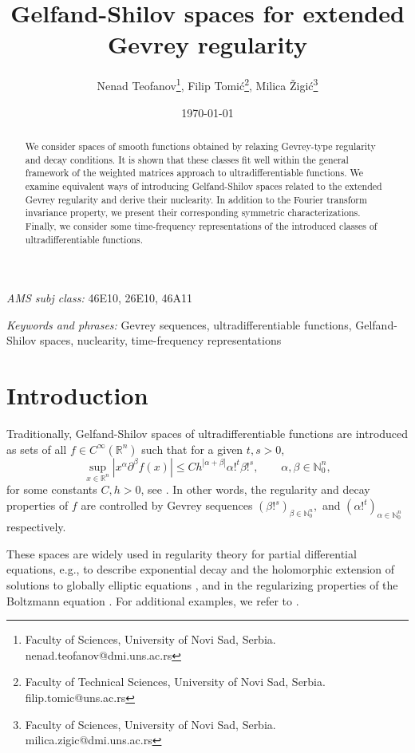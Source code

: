 \documentclass{article}
\title{Gelfand-Shilov spaces for extended Gevrey regularity}
\author{Nenad Teofanov\footnote{Faculty of Sciences, University of Novi Sad, Serbia. nenad.teofanov@dmi.uns.ac.rs}, Filip Tomi\'c\footnote{Faculty of Technical Sciences, University of Novi Sad, Serbia. filip.tomic@uns.ac.rs}, Milica \v Zigi\'c\footnote{Faculty of Sciences, University of Novi Sad, Serbia. milica.zigic@dmi.uns.ac.rs}}
\date{\today}
\theoremstyle{thmstyleone}
\theoremstyle{thmstyletwo}%
\theoremstyle{thmstylethree}%
\begin{document}
\maketitle

\begin{abstract}
 We consider spaces of smooth functions obtained by relaxing Gevrey-type regularity and decay conditions. It is shown that these classes fit well within the general framework of the weighted matrices approach to ultradifferentiable functions. We examine equivalent ways of introducing Gelfand-Shilov spaces related to the extended Gevrey regularity and derive their nuclearity. In addition to the Fourier transform invariance property, we present their corresponding symmetric characterizations. Finally, we consider some time-frequency representations of the introduced classes of ultradifferentiable functions.  
\end{abstract}

{\em AMS subj class:} 46E10,  26E10, 46A11 

{\em Keywords and phrases:} Gevrey sequences, ultradifferentiable functions, Gel\-fand-Shilov spaces, nuclearity, time-frequency representations

\section{Introduction} \label{Sec1}


Traditionally, Gelfand-Shilov spaces 
of ultradifferentiable functions 
are introduced as sets of all $f\in C^\infty (\mathbb R^n)$ such that for a given $t,s >0$,
\begin{equation}\label{Eq:GeShSpDef}
\sup _{x\in \mathbb R^n} |x^\alpha \partial^\beta f(x)| 
\leq C h^{|\alpha  + \beta |}\alpha !^t \beta !^s, \qquad \alpha, \beta \in \mathbb{N}_0 ^n,
\end{equation} 
for some constants $C,h>0$, see \cite{GelfandShilov}.  In other words,
the regularity and decay properties of $f$
are controlled by Gevrey sequences 
$(\beta !^s)_{\beta \in \mathbb{N}_0 ^n},$ and $(\alpha !^t)_{\alpha \in \mathbb{N}_0 ^n}$ respectively.

These spaces are widely used in regularity theory for partial differential equations, e.g., to describe exponential decay and the holomorphic extension of solutions to globally elliptic equations \cite{CGR-1, CGR-2}, and in the regularizing properties of the Boltzmann equation \cite{LMPSX}. For additional examples, we refer to \cite{Gramchev, Nicola-Rodino, Cordero-Rodino}.
\end{document}
